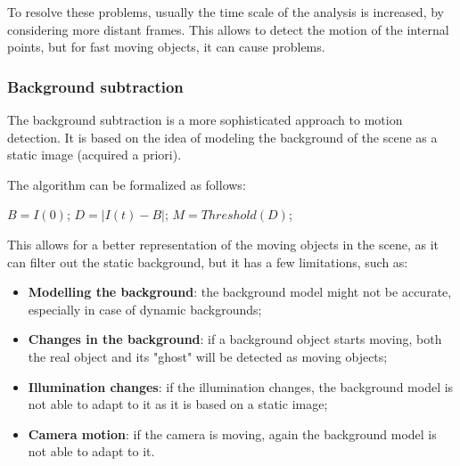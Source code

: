 To resolve these problems, usually the time scale of the analysis is increased, by considering more distant frames. 
This allows to detect the motion of the internal points, but for fast moving objects, it can cause problems.

\subsubsection{Background subtraction}
The background subtraction is a more sophisticated approach to motion detection. 
It is based on the idea of modeling the background of the scene as a static image (acquired a priori).

The algorithm can be formalized as follows:
\begin{algorithm}
    \caption{Background subtraction algorithm}
    \label{alg:bg_subtraction}
    \begin{algorithmic}[1]
        \State $B = I(0)$; 
            \State $D = |I(t) - B|$; 
            \State $M = Threshold(D)$; 
        \EndFor
    \end{algorithmic}
\end{algorithm}
This allows for a better representation of the moving objects in the scene, as it can filter out the static background, 
but it has a few limitations, such as:
\begin{itemize}
    \item \textbf{Modelling the background}: the background model might not be accurate, especially in case of dynamic backgrounds;
    \item \textbf{Changes in the background}: if a background object starts moving, both the real object and its "ghost" will be detected as moving objects;
    \item \textbf{Illumination changes}: if the illumination changes, the background model is not able to adapt to it as it is based on a static image;
    \item \textbf{Camera motion}: if the camera is moving, again the background model is not able to adapt to it.
\end{itemize}

